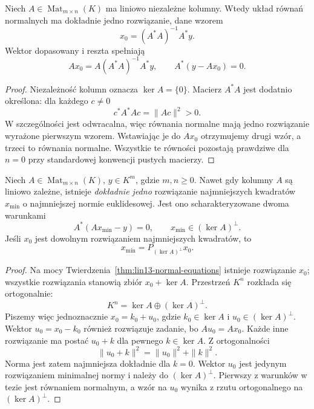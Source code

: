 \begin{wniosek}
\label{cor:lin13-ls-full-rank}
Niech \(A\in\operatorname{Mat}_{m\times n}(K)\)
ma liniowo niezależne kolumny.
Wtedy układ równań normalnych
ma dokładnie jedno rozwiązanie,
dane wzorem
\[
 x_0=(A^*A)^{-1}A^*y.
\]
Wektor dopasowany i reszta
spełniają
\[
 Ax_0=A(A^*A)^{-1}A^*y,\qquad
 A^*(y-Ax_0)=0.
\]
\end{wniosek}
\begin{proof}
Niezależność kolumn oznacza
\(\ker A=\{0\}\).
Macierz \(A^*A\) jest
dodatnio określona:
dla każdego \(c\ne0\)
\[
 c^*A^*Ac=\|Ac\|^2>0.
\]
W szczególności jest odwracalna,
więc równania normalne mają
jedno rozwiązanie wyrażone
pierwszym wzorem.
Wstawiając je do \(Ax_0\)
otrzymujemy drugi wzór,
a trzeci to równania normalne.
Wszystkie te równości
pozostają prawdziwe dla \(n=0\)
przy standardowej konwencji
pustych macierzy.
\end{proof}

\begin{twierdzenie}
\label{thm:lin13-ls-minnorm}
Niech \(A\in\operatorname{Mat}_{m\times n}(K)\),
\(y\in K^m\), gdzie \(m,n\ge0\).
Nawet gdy kolumny \(A\) są
liniowo zależne, istnieje
\emph{dokładnie jedno}
rozwiązanie najmniejszych kwadratów
\(x_{\min}\) o najmniejszej
normie euklidesowej.
Jest ono scharakteryzowane
dwoma warunkami
\[
 A^*(Ax_{\min}-y)=0,\qquad
 x_{\min}\in(\ker A)^\perp.
\]
Jeśli \(x_0\) jest dowolnym
rozwiązaniem najmniejszych kwadratów,
to
\[
 x_{\min}
 =P_{(\ker A)^\perp}x_0.
\]
\end{twierdzenie}
\begin{proof}
Na mocy
Twierdzenia~\ref{thm:lin13-normal-equations}
istnieje rozwiązanie \(x_0\);
wszystkie rozwiązania
stanowią zbiór \(x_0+\ker A\).
Przestrzeń \(K^n\) rozkłada się
ortogonalnie:
\[
 K^n=\ker A\oplus(\ker A)^\perp.
\]
Piszemy więc jednoznacznie
\(x_0=k_0+u_0\),
gdzie \(k_0\in\ker A\)
i \(u_0\in(\ker A)^\perp\).
Wektor \(u_0=x_0-k_0\)
również rozwiązuje zadanie,
bo \(Au_0=Ax_0\).
Każde inne rozwiązanie
ma postać \(u_0+k\)
dla pewnego \(k\in\ker A\).
Z ortogonalności
\[
 \|u_0+k\|^2=\|u_0\|^2+\|k\|^2.
\]
Norma jest zatem najmniejsza
dokładnie dla \(k=0\).
Wektor \(u_0\) jest jedynym
rozwiązaniem minimalnej normy
i należy do \((\ker A)^\perp\).
Pierwszy z warunków w tezie
jest równaniem normalnym,
a wzór na \(u_0\) wynika z
rzutu ortogonalnego na
\((\ker A)^\perp\).
\end{proof}

